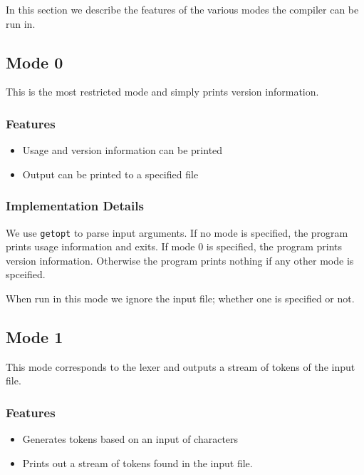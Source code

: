 \documentclass{article}
\begin{document}
In this section we describe the features of the various modes the compiler can be run in.

\subsection{Mode 0}

This is the most restricted mode and simply prints version information.

\subsubsection{Features}

\begin{itemize}
    \item Usage and version information can be printed
    \item Output can be printed to a specified file
\end{itemize}

\subsubsection{Implementation Details}

We use \verb|getopt| to parse input arguments. If no mode is specified, the program prints usage information and exits. If mode 0 is specified, the program prints version information. Otherwise the program prints nothing if any other mode is spceified. 

When run in this mode we ignore the input file; whether one is specified or not.

\subsection{Mode 1}

This mode corresponds to the lexer and outputs a stream of tokens of the input file.

\subsubsection{Features}

\begin{itemize}
    \item Generates tokens based on an input of characters
    \item Prints out a stream of tokens found in the input file.
\end{itemize}
\end{document}
